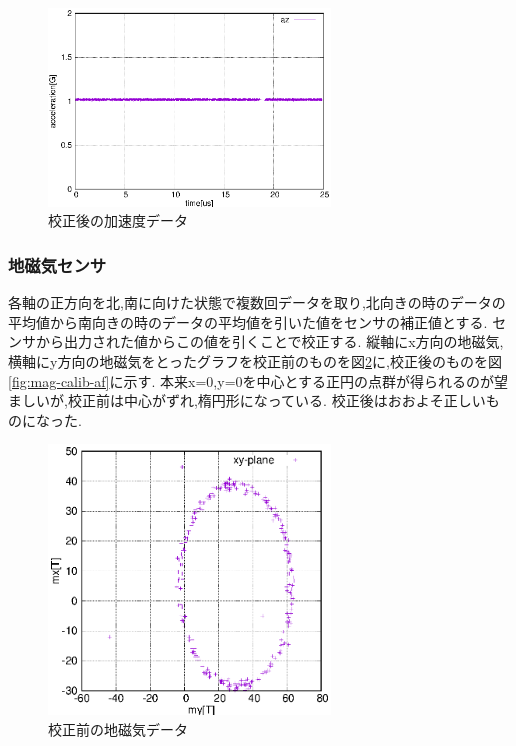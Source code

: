 \documentclass[12pt,oneside]{sotsuken_paper}
\begin{document}
\begin{figure}[htbp]
	\begin{center}
		\includegraphics[width=75mm]{image/calibration/acc-calib-af.eps}
		\caption{校正後の加速度データ}
		\label{fig:acc-calib-af}
	\end{center}
\end{figure}

\subsubsection{地磁気センサ}
各軸の正方向を北,南に向けた状態で複数回データを取り,北向きの時のデータの平均値から南向きの時のデータの平均値を引いた値をセンサの補正値とする.
センサから出力された値からこの値を引くことで校正する.
縦軸にx方向の地磁気,横軸にy方向の地磁気をとったグラフを校正前のものを図\ref{fig:mag-calib-be}に,校正後のものを図\ref{fig:mag-calib-af}に示す.
本来x=0,y=0を中心とする正円の点群が得られるのが望ましいが,校正前は中心がずれ,楕円形になっている.
校正後はおおよそ正しいものになった.

\begin{figure}[htbp]
	\begin{center}
		\includegraphics[width=75mm]{image/calibration/mag-calib-be.eps}
		\caption{校正前の地磁気データ}
		\label{fig:mag-calib-be}
	\end{center}
\end{figure}
\end{document}

